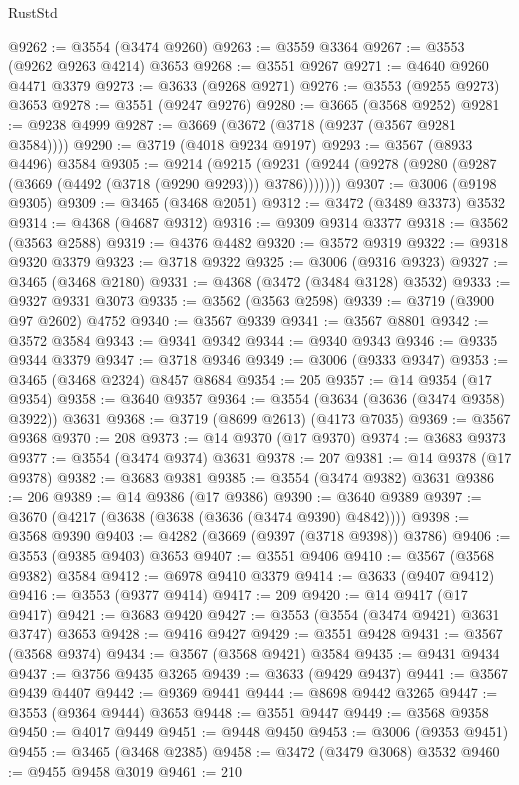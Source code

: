 \begin{lexlean}{RustStd}
\begin{coremodule}
@9262 := @3554 (@3474 @9260)
@9263 := @3559 @3364
@9267 := @3553 (@9262 @9263 @4214) @3653
@9268 := @3551 @9267
@9271 := @4640 @9260 @4471 @3379
@9273 := @3633 (@9268 @9271)
@9276 := @3553 (@9255 @9273) @3653
@9278 := @3551 (@9247 @9276)
@9280 := @3665 (@3568 @9252)
@9281 := @9238 @4999
@9287 := @3669 (@3672 (@3718 (@9237 (@3567 @9281 @3584))))
@9290 := @3719 (@4018 @9234 @9197)
@9293 := @3567 (@8933 @4496) @3584
@9305 := @9214
    (@9215 (@9231 (@9244 (@9278 (@9280 (@9287 (@3669 (@4492 (@3718 (@9290 @9293))) @3786)))))))
@9307 := @3006 (@9198 @9305)
@9309 := @3465 (@3468 @2051)
@9312 := @3472 (@3489 @3373) @3532
@9314 := @4368 (@4687 @9312)
@9316 := @9309 @9314 @3377
@9318 := @3562 (@3563 @2588)
@9319 := @4376 @4482
@9320 := @3572 @9319
@9322 := @9318 @9320 @3379
@9323 := @3718 @9322
@9325 := @3006 (@9316 @9323)
@9327 := @3465 (@3468 @2180)
@9331 := @4368 (@3472 (@3484 @3128) @3532)
@9333 := @9327 @9331 @3073
@9335 := @3562 (@3563 @2598)
@9339 := @3719 (@3900 @97 @2602) @4752
@9340 := @3567 @9339
@9341 := @3567 @8801
@9342 := @3572 @3584
@9343 := @9341 @9342
@9344 := @9340 @9343
@9346 := @9335 @9344 @3379
@9347 := @3718 @9346
@9349 := @3006 (@9333 @9347)
@9353 := @3465 (@3468 @2324) @8457 @8684
@9354 := 205
@9357 := @14 @9354 (@17 @9354)
@9358 := @3640 @9357
@9364 := @3554 (@3634 (@3636 (@3474 @9358) @3922)) @3631
@9368 := @3719 (@8699 @2613) (@4173 @7035)
@9369 := @3567 @9368
@9370 := 208
@9373 := @14 @9370 (@17 @9370)
@9374 := @3683 @9373
@9377 := @3554 (@3474 @9374) @3631
@9378 := 207
@9381 := @14 @9378 (@17 @9378)
@9382 := @3683 @9381
@9385 := @3554 (@3474 @9382) @3631
@9386 := 206
@9389 := @14 @9386 (@17 @9386)
@9390 := @3640 @9389
@9397 := @3670 (@4217 (@3638 (@3638 (@3636 (@3474 @9390) @4842))))
@9398 := @3568 @9390
@9403 := @4282 (@3669 (@9397 (@3718 @9398)) @3786)
@9406 := @3553 (@9385 @9403) @3653
@9407 := @3551 @9406
@9410 := @3567 (@3568 @9382) @3584
@9412 := @6978 @9410 @3379
@9414 := @3633 (@9407 @9412)
@9416 := @3553 (@9377 @9414)
@9417 := 209
@9420 := @14 @9417 (@17 @9417)
@9421 := @3683 @9420
@9427 := @3553 (@3554 (@3474 @9421) @3631 @3747) @3653
@9428 := @9416 @9427
@9429 := @3551 @9428
@9431 := @3567 (@3568 @9374)
@9434 := @3567 (@3568 @9421) @3584
@9435 := @9431 @9434
@9437 := @3756 @9435 @3265
@9439 := @3633 (@9429 @9437)
@9441 := @3567 @9439 @4407
@9442 := @9369 @9441
@9444 := @8698 @9442 @3265
@9447 := @3553 (@9364 @9444) @3653
@9448 := @3551 @9447
@9449 := @3568 @9358
@9450 := @4017 @9449
@9451 := @9448 @9450
@9453 := @3006 (@9353 @9451)
@9455 := @3465 (@3468 @2385)
@9458 := @3472 (@3479 @3068) @3532
@9460 := @9455 @9458 @3019
@9461 := 210

\end{coremodule}
\end{lexlean}
